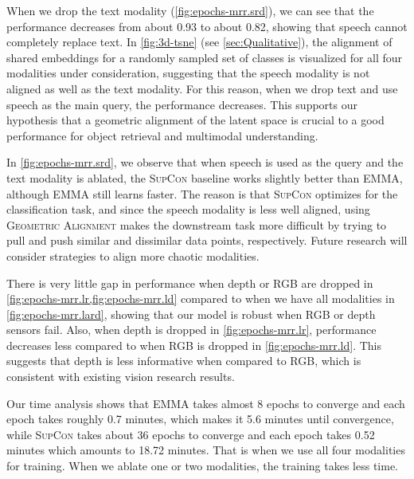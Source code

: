 \documentclass[10pt]{article} %
\newcommand{\todocmi}[1]{\todo[inline,color=green!40]{\small #1 -- Cynthia}}
\newcommand{\ours}{\textsc{EMMA}}
\newcommand{\geom}{\textsc{Geometric Alignment}}
\newcommand{\supcon}{\textsc{SupCon}}
\begin{document}
When we drop the text modality (\cref{fig:epochs-mrr.srd}), we can see that the performance decreases from about 0.93 to about 0.82, showing that speech cannot completely replace text. In \cref{fig:3d-tsne} (see \cref{sec:Qualitative}), the alignment of shared embeddings for a randomly sampled set of classes is visualized for all four modalities under consideration, suggesting that the speech modality is not aligned as well as the text modality. For this reason, when we drop text and use speech as the main query, the performance decreases. This supports our hypothesis that a geometric alignment of the latent space is crucial to a good performance for object retrieval and multimodal understanding.

In \cref{fig:epochs-mrr.srd}, we observe that when speech is used as the query and the text modality is ablated, the \supcon{} baseline works slightly better than \ours{}, although \ours{} still learns faster. The reason is that \supcon{} optimizes for the classification task, and since the speech modality is less well aligned, using \geom{} makes the downstream task more difficult by trying to pull and push similar and dissimilar data points, respectively. Future research will consider strategies to align more chaotic modalities.

There is very little gap in performance when depth or RGB are dropped in \cref{fig:epochs-mrr.lr,fig:epochs-mrr.ld} compared to when we have all modalities in \cref{fig:epochs-mrr.lard}, showing that our model is robust when RGB or depth sensors fail. Also, when depth is dropped in \cref{fig:epochs-mrr.lr}, performance decreases less compared to when RGB is dropped in \cref{fig:epochs-mrr.ld}. This suggests that depth is less informative when compared to RGB, which is consistent with existing vision research results. 


Our time analysis shows that EMMA takes almost 8 epochs to converge and each epoch takes roughly 0.7 minutes, which makes it 5.6 minutes until convergence, while \supcon{} takes about 36 epochs to converge and each epoch takes 0.52 minutes which amounts to 18.72 minutes. That is when we use all four modalities for training. When we ablate one or two modalities, the training takes less time.
\end{document}
